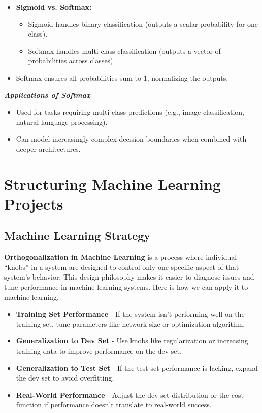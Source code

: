 \documentclass[letterpaper,12pt,notitlepage,twoside]{report}
\begin{document}
\begin{itemize}
    \item \textbf{Sigmoid vs. Softmax:}
    \begin{itemize}
        \item Sigmoid handles binary classification (outputs a scalar probability for one class).
        \item Softmax handles multi-class classification (outputs a vector of probabilities across classes).
    \end{itemize}
    \item Softmax ensures all probabilities sum to 1, normalizing the outputs.
\end{itemize}

\textit{\textbf{Applications of Softmax}}
\begin{itemize}
    \item Used for tasks requiring multi-class predictions (e.g., image classification, natural language processing).
    \item Can model increasingly complex decision boundaries when combined with deeper architectures.
\end{itemize}

\chapter{Structuring Machine Learning Projects} \label{ch:3}
\section{Machine Learning Strategy}
\textbf{Orthogonalization in Machine Learning} is a process where individual ``knobs'' in a system are designed to control only one specific aspect of that system's behavior. This design philosophy makes it easier to diagnose issues and tune performance in machine learning systems. Here is how we can apply it to machine learning.
\begin{itemize}[noitemsep, topsep=0pt]
\item \textbf{Training Set Performance} - If the system isn’t performing well on the training set, tune parameters like network size or optimization algorithm.
\item \textbf{Generalization to Dev Set} - Use knobs like regularization or increasing training data to improve performance on the dev set.
\item \textbf{Generalization to Test Set} - If the test set performance is lacking, expand the dev set to avoid overfitting.
\item \textbf{Real-World Performance} - Adjust the dev set distribution or the cost function if performance doesn’t translate to real-world success.
\end{itemize}
\end{document}
